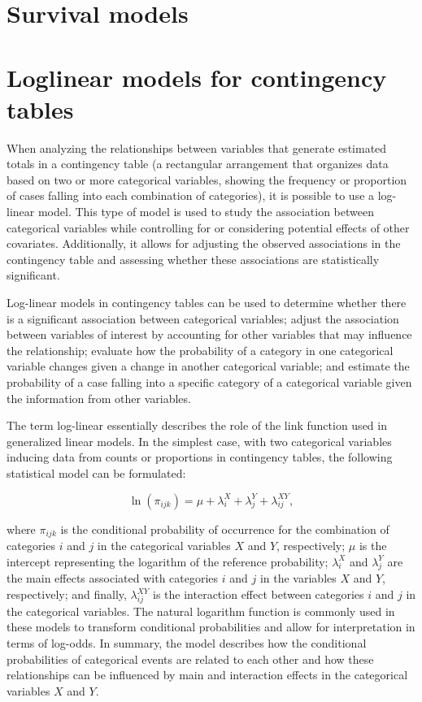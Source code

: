 \documentclass[
  12pt,
]{book}
\begin{document}
\section{Survival models}\label{survival-models}

\section{Loglinear models for contingency tables}\label{loglinear-models-for-contingency-tables}

When analyzing the relationships between variables that generate estimated totals in a contingency table (a rectangular arrangement that organizes data based on two or more categorical variables, showing the frequency or proportion of cases falling into each combination of categories), it is possible to use a log-linear model. This type of model is used to study the association between categorical variables while controlling for or considering potential effects of other covariates. Additionally, it allows for adjusting the observed associations in the contingency table and assessing whether these associations are statistically significant.

Log-linear models in contingency tables can be used to determine whether there is a significant association between categorical variables; adjust the association between variables of interest by accounting for other variables that may influence the relationship; evaluate how the probability of a category in one categorical variable changes given a change in another categorical variable; and estimate the probability of a case falling into a specific category of a categorical variable given the information from other variables.

The term log-linear essentially describes the role of the link function used in generalized linear models. In the simplest case, with two categorical variables inducing data from counts or proportions in contingency tables, the following statistical model can be formulated:

\[
\ln(\pi_{ijk}) = \mu + \lambda_i^X + \lambda_j^Y + \lambda_{ij}^{XY},   
\]

where \(\pi_{ijk}\) is the conditional probability of occurrence for the combination of categories \(i\) and \(j\) in the categorical variables \(X\) and \(Y\), respectively; \(\mu\) is the intercept representing the logarithm of the reference probability; \(\lambda_i^X\) and \(\lambda_j^Y\) are the main effects associated with categories \(i\) and \(j\) in the variables \(X\) and \(Y\), respectively; and finally, \(\lambda_{ij}^{XY}\) is the interaction effect between categories \(i\) and \(j\) in the categorical variables. The natural logarithm function is commonly used in these models to transform conditional probabilities and allow for interpretation in terms of log-odds. In summary, the model describes how the conditional probabilities of categorical events are related to each other and how these relationships can be influenced by main and interaction effects in the categorical variables \(X\) and \(Y\).
\end{document}
